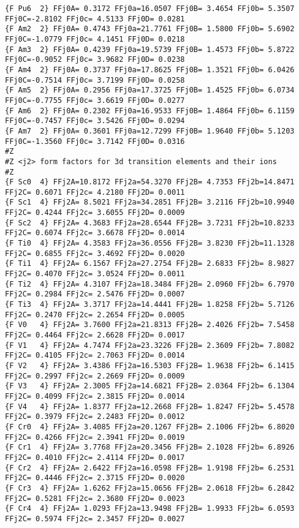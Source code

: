 {\begin{verbatim}
{F Pu6  2} FFj0A= 0.3172 FFj0a=16.0507 FFj0B= 3.4654 FFj0b= 5.3507 FFj0C=-2.8102 FFj0c= 4.5133 FFj0D= 0.0281 
{F Am2  2} FFj0A= 0.4743 FFj0a=21.7761 FFj0B= 1.5800 FFj0b= 5.6902 FFj0C=-1.0779 FFj0c= 4.1451 FFj0D= 0.0218 
{F Am3  2} FFj0A= 0.4239 FFj0a=19.5739 FFj0B= 1.4573 FFj0b= 5.8722 FFj0C=-0.9052 FFj0c= 3.9682 FFj0D= 0.0238 
{F Am4  2} FFj0A= 0.3737 FFj0a=17.8625 FFj0B= 1.3521 FFj0b= 6.0426 FFj0C=-0.7514 FFj0c= 3.7199 FFj0D= 0.0258 
{F Am5  2} FFj0A= 0.2956 FFj0a=17.3725 FFj0B= 1.4525 FFj0b= 6.0734 FFj0C=-0.7755 FFj0c= 3.6619 FFj0D= 0.0277 
{F Am6  2} FFj0A= 0.2302 FFj0a=16.9533 FFj0B= 1.4864 FFj0b= 6.1159 FFj0C=-0.7457 FFj0c= 3.5426 FFj0D= 0.0294 
{F Am7  2} FFj0A= 0.3601 FFj0a=12.7299 FFj0B= 1.9640 FFj0b= 5.1203 FFj0C=-1.3560 FFj0c= 3.7142 FFj0D= 0.0316 
#Z
#Z <j2> form factors for 3d transition elements and their ions
#Z
{F Sc0  4} FFj2A=10.8172 FFj2a=54.3270 FFj2B= 4.7353 FFj2b=14.8471 FFj2C= 0.6071 FFj2c= 4.2180 FFj2D= 0.0011 
{F Sc1  4} FFj2A= 8.5021 FFj2a=34.2851 FFj2B= 3.2116 FFj2b=10.9940 FFj2C= 0.4244 FFj2c= 3.6055 FFj2D= 0.0009 
{F Sc2  4} FFj2A= 4.3683 FFj2a=28.6544 FFj2B= 3.7231 FFj2b=10.8233 FFj2C= 0.6074 FFj2c= 3.6678 FFj2D= 0.0014 
{F Ti0  4} FFj2A= 4.3583 FFj2a=36.0556 FFj2B= 3.8230 FFj2b=11.1328 FFj2C= 0.6855 FFj2c= 3.4692 FFj2D= 0.0020 
{F Ti1  4} FFj2A= 6.1567 FFj2a=27.2754 FFj2B= 2.6833 FFj2b= 8.9827 FFj2C= 0.4070 FFj2c= 3.0524 FFj2D= 0.0011 
{F Ti2  4} FFj2A= 4.3107 FFj2a=18.3484 FFj2B= 2.0960 FFj2b= 6.7970 FFj2C= 0.2984 FFj2c= 2.5476 FFj2D= 0.0007 
{F Ti3  4} FFj2A= 3.3717 FFj2a=14.4441 FFj2B= 1.8258 FFj2b= 5.7126 FFj2C= 0.2470 FFj2c= 2.2654 FFj2D= 0.0005 
{F V0   4} FFj2A= 3.7600 FFj2a=21.8313 FFj2B= 2.4026 FFj2b= 7.5458 FFj2C= 0.4464 FFj2c= 2.6628 FFj2D= 0.0017 
{F V1   4} FFj2A= 4.7474 FFj2a=23.3226 FFj2B= 2.3609 FFj2b= 7.8082 FFj2C= 0.4105 FFj2c= 2.7063 FFj2D= 0.0014 
{F V2   4} FFj2A= 3.4386 FFj2a=16.5303 FFj2B= 1.9638 FFj2b= 6.1415 FFj2C= 0.2997 FFj2c= 2.2669 FFj2D= 0.0009 
{F V3   4} FFj2A= 2.3005 FFj2a=14.6821 FFj2B= 2.0364 FFj2b= 6.1304 FFj2C= 0.4099 FFj2c= 2.3815 FFj2D= 0.0014 
{F V4   4} FFj2A= 1.8377 FFj2a=12.2668 FFj2B= 1.8247 FFj2b= 5.4578 FFj2C= 0.3979 FFj2c= 2.2483 FFj2D= 0.0012 
{F Cr0  4} FFj2A= 3.4085 FFj2a=20.1267 FFj2B= 2.1006 FFj2b= 6.8020 FFj2C= 0.4266 FFj2c= 2.3941 FFj2D= 0.0019 
{F Cr1  4} FFj2A= 3.7768 FFj2a=20.3456 FFj2B= 2.1028 FFj2b= 6.8926 FFj2C= 0.4010 FFj2c= 2.4114 FFj2D= 0.0017 
{F Cr2  4} FFj2A= 2.6422 FFj2a=16.0598 FFj2B= 1.9198 FFj2b= 6.2531 FFj2C= 0.4446 FFj2c= 2.3715 FFj2D= 0.0020 
{F Cr3  4} FFj2A= 1.6262 FFj2a=15.0656 FFj2B= 2.0618 FFj2b= 6.2842 FFj2C= 0.5281 FFj2c= 2.3680 FFj2D= 0.0023 
{F Cr4  4} FFj2A= 1.0293 FFj2a=13.9498 FFj2B= 1.9933 FFj2b= 6.0593 FFj2C= 0.5974 FFj2c= 2.3457 FFj2D= 0.0027 

\end{verbatim}}
